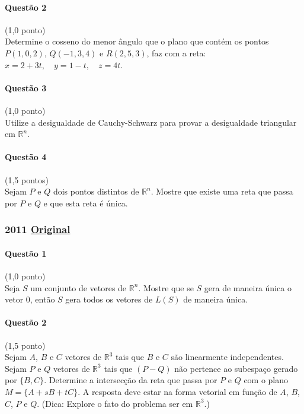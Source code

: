 \documentclass[12pt,a4paper]{article}
\newcommand{\R}{\mathbb{R}}
\newcommand{\original}[1]{\tiny \href{#1}{Original} \normalsize}
\begin{document}
\paragraph{Questão 2} (1,0 ponto)\\
Determine o cosseno do menor ângulo que o plano que contém os pontos $P(1,0,2)$, $Q(-1,3,4)$ e $R(2,5,3)$, faz com a reta: $x=2+3t,\quad y=1-t,\quad z=4t$.

\paragraph{Questão 3} (1,0 ponto)\\
Utilize a desigualdade de Cauchy-Schwarz para provar a desigualdade triangular em $\R^n$.

\paragraph{Questão 4} (1,5 pontos)\\
Sejam $P$ e $Q$ dois pontos distintos de $\R^n$. Mostre que existe uma reta que passa por $P$ e $Q$ e que esta reta é única.

\newpage

\subsubsection{2011 \original{https://drive.google.com/file/d/1uCnndlKdxQAfkaMKY4NBQNDOhq1EG5uW/view?usp=sharing}}

\paragraph{Questão 1} (1,0 ponto)\\
Seja $S$ um conjunto de vetores de $\R^n$. Mostre que se $S$ gera de maneira única o vetor $0$, então $S$ gera todos os vetores de $L(S)$ de maneira única.

\paragraph{Questão 2} (1,5 ponto)\\
Sejam $A$, $B$ e $C$ vetores de $\R ^3$ tais que $B$ e $C$ são linearmente independentes. Sejam $P$ e $Q$ vetores de $\R^3$ tais que $(P-Q)$ não pertence ao subespaço gerado por $\{B, C\}$. Determine a intersecção da reta que passa por $P$ e $Q$ com o plano $M=\{A+sB+tC\}$. A resposta deve estar na forma vetorial em função de $A$, $B$, $C$, $P$ e $Q$. (Dica: Explore o fato do problema ser em $\R^3$.)
\end{document}
